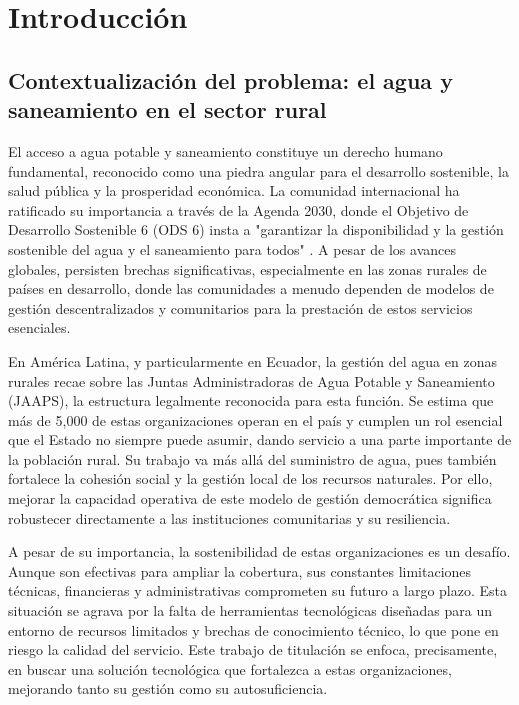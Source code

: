 \chapter{Introducción}
\label{ch:introduccion}

\section{Contextualización del problema: el agua y saneamiento en el sector rural}
\label{sec:problem_context}

El acceso a agua potable y saneamiento constituye un derecho humano fundamental, reconocido como una piedra angular para el desarrollo sostenible, la salud pública y la prosperidad económica. La comunidad internacional ha ratificado su importancia a través de la Agenda 2030, donde el Objetivo de Desarrollo Sostenible 6 (ODS 6) insta a "garantizar la disponibilidad y la gestión sostenible del agua y el saneamiento para todos" \parencite{NacionesUnidas2015}. A pesar de los avances globales, persisten brechas significativas, especialmente en las zonas rurales de países en desarrollo, donde las comunidades a menudo dependen de modelos de gestión descentralizados y comunitarios para la prestación de estos servicios esenciales.

En América Latina, y particularmente en Ecuador, la gestión del agua en zonas rurales recae sobre las Juntas Administradoras de Agua Potable y Saneamiento (JAAPS), la estructura legalmente reconocida para esta función. Se estima que más de 5,000 de estas organizaciones operan en el país y cumplen un rol esencial que el Estado no siempre puede asumir, dando servicio a una parte importante de la población rural. Su trabajo va más allá del suministro de agua, pues también fortalece la cohesión social y la gestión local de los recursos naturales. Por ello, mejorar la capacidad operativa de este modelo de gestión democrática significa robustecer directamente a las instituciones comunitarias y su resiliencia.

A pesar de su importancia, la sostenibilidad de estas organizaciones es un desafío. Aunque son efectivas para ampliar la cobertura, sus constantes limitaciones técnicas, financieras y administrativas comprometen su futuro a largo plazo. Esta situación se agrava por la falta de herramientas tecnológicas diseñadas para un entorno de recursos limitados y brechas de conocimiento técnico, lo que pone en riesgo la calidad del servicio. Este trabajo de titulación se enfoca, precisamente, en buscar una solución tecnológica que fortalezca a estas organizaciones, mejorando tanto su gestión como su autosuficiencia.

